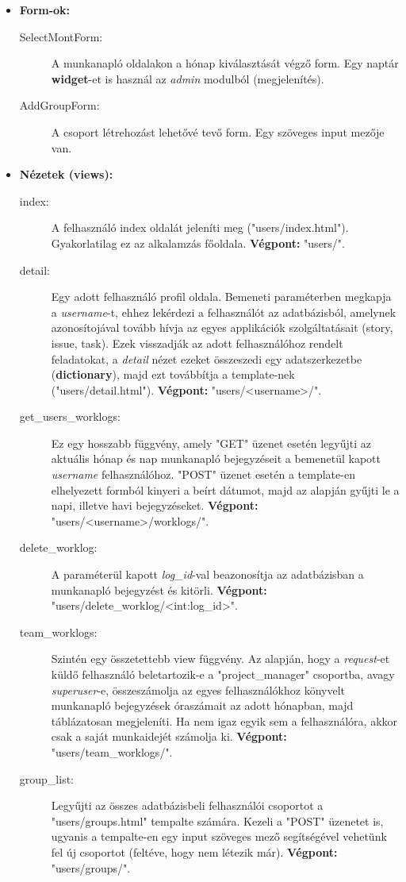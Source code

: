 \begin{itemize}
	\item \textbf{Form-ok:}
	\begin{description}
		\item[SelectMontForm:] A munkanapló oldalakon a hónap kiválasztását végző form. Egy naptár \textbf{widget}-et is használ az \textit{admin} modulból (megjelenítés).
		\item[AddGroupForm:] A csoport létrehozást lehetővé tevő form. Egy szöveges input mezője van.
	\end{description}
	\item \textbf{Nézetek (views):}
	\begin{description}
		\item[index:] A felhasználó index oldalát jeleníti meg ("users/index.html"). Gyakorlatilag ez az alkalamzás főoldala. \textbf{Végpont:} "users/".
		\item[detail:] Egy adott felhasználó profil oldala. Bemeneti paraméterben megkapja a \textit{username}-t, ehhez lekérdezi a felhasználót az adatbázisból, amelynek azonosítojával tovább hívja az egyes applikációk szolgáltatásait (story, issue, task). Ezek visszadják az adott felhasználóhoz rendelt feladatokat, a \textit{detail} nézet ezeket összeszedi egy adatszerkezetbe (\textbf{dictionary}), majd ezt továbbítja a template-nek ("users/detail.html"). \textbf{Végpont:} "users/<username>/".
		\item[get\_users\_worklogs:] Ez egy hosszabb függvény, amely "GET" üzenet esetén legyűjti az aktuális hónap és nap munkanapló bejegyzéseit a bemenetül kapott \textit{username} felhasználóhoz. "POST" üzenet esetén a template-en elhelyezett formból kinyeri a beírt dátumot, majd az alapján gyűjti le a napi, illetve havi bejegyzéseket. \textbf{Végpont:} "users/<username>/worklogs/".
		\item[delete\_worklog:] A paraméterül kapott \textit{log\_id}-val beazonosítja az adatbázisban a munkanapló bejegyzést és kitörli. \textbf{Végpont:} "users/delete\_worklog/<int:log\_id>".
		\item[team\_worklogs:] Szintén egy összetettebb view függvény. Az alapján, hogy a \textit{request}-et küldő felhasználó beletartozik-e a "project\_manager"  csoportba, avagy \textit{superuser}-e, összeszámolja az egyes felhasználókhoz könyvelt munkanapló bejegyzések óraszámait az adott hónapban, majd táblázatosan megjeleníti. Ha nem igaz egyik sem a felhasználóra, akkor csak a saját munkaidejét számolja ki. \textbf{Végpont:} "users/team\_worklogs/".
		\item[group\_list:] Legyűjti az összes adatbázisbeli felhasználói csoportot a "users/groups.html" tempalte számára. Kezeli a "POST" üzenetet is, ugyanis a tempalte-en egy input szöveges mező segítségével vehetünk fel új csoportot (feltéve, hogy nem létezik már). \textbf{Végpont:} "users/groups/".

\end{description}
\end{itemize}
